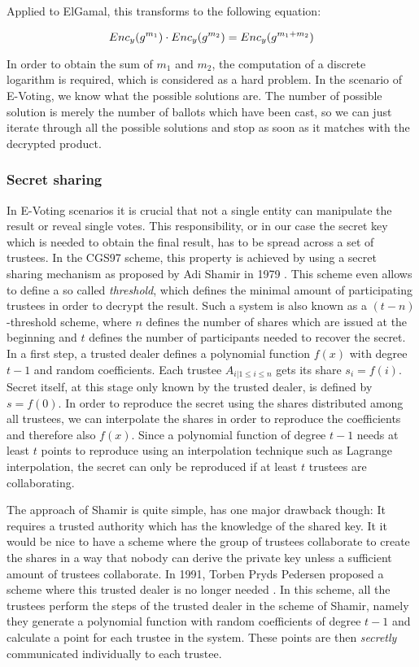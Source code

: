 \documentclass[numbers=noenddot, abstract=on, a4paper, headsepline,
footsepline, oneside, draft=off]{scrreprt}
\begin{document}
Applied to ElGamal, this transforms to the following equation:

\begin{equation}
Enc_y(g^{m_1}) \cdot Enc_y(g^{m_2}) = Enc_y(g^{m_1 + m_2}) \notag
\end{equation}

In order to obtain the sum of $m_1$ and $m_2$, the computation of a discrete
logarithm is required, which is considered as a hard problem. In the scenario of
E-Voting, we know what the possible solutions are. The number of possible
solution is merely the number of ballots which have been cast, so we can just
iterate through all the possible solutions and stop as soon as it matches with
the decrypted product.


\subsubsection{Secret sharing}
\label{sec:secretsharing}
In E-Voting scenarios it is crucial that not a
single entity can manipulate the result or reveal single votes. This
responsibility, or in our case the secret key which is needed to obtain the
final result, has to be spread across a set of trustees. In the CGS97 scheme,
this property is achieved by using a secret sharing mechanism as proposed by Adi
Shamir in 1979 \cite{Shamir79}. This scheme even allows to define a so called
\textit{threshold}, which defines the minimal amount of participating trustees
in order to decrypt the result. Such a system is also known as a
$(t-n)$-threshold scheme, where $n$ defines the number of shares which are
issued at the beginning and $t$ defines the number of participants needed to
recover the secret. In a first step, a trusted dealer defines a polynomial
function $f(x)$ with degree $t-1$ and random coefficients. Each trustee $A_{i |
1 \leq i \leq n}$ gets its share $s_i=f(i)$. Secret itself, at this stage only
known by the trusted dealer, is defined by $s=f(0)$. In order to reproduce the
secret using the shares distributed among all trustees, we can interpolate the
shares in order to reproduce the coefficients and therefore also $f(x)$. Since a
polynomial function of degree $t-1$ needs at least $t$ points to reproduce using
an interpolation technique such as Lagrange interpolation, the secret can only
be reproduced if at least $t$ trustees are collaborating. 

The approach of Shamir is quite simple, has one major drawback though: It
requires a trusted authority which has the knowledge of the shared key. It it
would be nice to have a scheme where the group of trustees collaborate to create
the shares in a way that nobody can derive the private key unless a sufficient
amount of trustees collaborate. In 1991, Torben Pryds Pedersen proposed a scheme
where this trusted dealer is no longer needed \cite{PED91}. In this scheme, all the
trustees perform the steps of the trusted dealer in the scheme of Shamir, namely
they generate a polynomial function with random coefficients of degree $t-1$ and
calculate a point for each trustee in the system. These points are then
\textit{secretly} communicated individually to each trustee.
\end{document}

